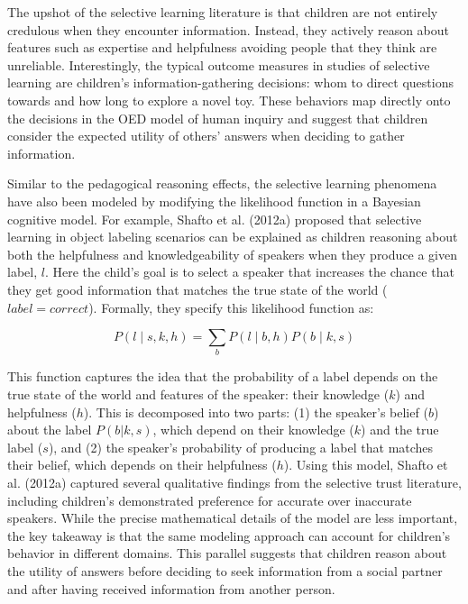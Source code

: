 \documentclass[english,floatsintext,man]{apa6}
\theoremstyle{definition}
\theoremstyle{definition}
\theoremstyle{definition}
\theoremstyle{remark}
\begin{document}
The upshot of the selective learning literature is that children are not
entirely credulous when they encounter information. Instead, they
actively reason about features such as expertise and helpfulness
avoiding people that they think are unreliable. Interestingly, the
typical outcome measures in studies of selective learning are children's
information-gathering decisions: whom to direct questions towards and
how long to explore a novel toy. These behaviors map directly onto the
decisions in the OED model of human inquiry and suggest that children
consider the expected utility of others' answers when deciding to gather
information.

Similar to the pedagogical reasoning effects, the selective learning
phenomena have also been modeled by modifying the likelihood function in
a Bayesian cognitive model. For example, Shafto et al. (2012a) proposed
that selective learning in object labeling scenarios can be explained as
children reasoning about both the helpfulness and knowledgeability of
speakers when they produce a given label, \(l\). Here the child's goal
is to select a speaker that increases the chance that they get good
information that matches the true state of the world
(\(label=correct\)). Formally, they specify this likelihood function as:

\[P(l \mid s,k,h) = \sum_b P(l \mid b,h)P(b \mid k,s)\]

\noindent
This function captures the idea that the probability of a label depends
on the true state of the world and features of the speaker: their
knowledge (\(k\)) and helpfulness (\(h\)). This is decomposed into two
parts: (1) the speaker's belief (\(b\)) about the label \(P(b|k,s)\),
which depend on their knowledge (\(k\)) and the true label (\(s\)), and
(2) the speaker's probability of producing a label that matches their
belief, which depends on their helpfulness (\(h\)). Using this model,
Shafto et al. (2012a) captured several qualitative findings from the
selective trust literature, including children's demonstrated preference
for accurate over inaccurate speakers. While the precise mathematical
details of the model are less important, the key takeaway is that the
same modeling approach can account for children's behavior in different
domains. This parallel suggests that children reason about the utility
of answers before deciding to seek information from a social partner and
after having received information from another person.
\end{document}
